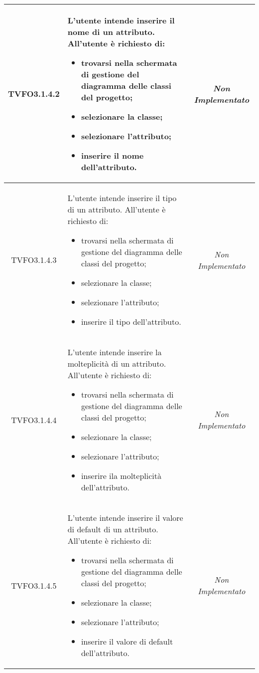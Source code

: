 \begin{longtable}{|c|>{}m{8cm}|c|}
\hypertarget{TVFO3.1.4.2}{TVFO3.1.4.2} & L'utente intende inserire il nome di un attributo.
All'utente è richiesto di:
\begin{itemize}
\item trovarsi nella schermata di gestione del diagramma delle classi del progetto;
\item selezionare la classe;
\item selezionare l'attributo; 
\item inserire il nome dell'attributo.
\end{itemize} & \textit{Non Implementato}\\ \hline
\hypertarget{TVFO3.1.4.3}{TVFO3.1.4.3} & L'utente intende inserire il tipo di un attributo.
All'utente è richiesto di:
\begin{itemize}
\item trovarsi nella schermata di gestione del diagramma delle classi del progetto;
\item selezionare la classe;
\item selezionare l'attributo;
\item inserire il tipo dell'attributo.
\end{itemize} & \textit{Non Implementato}\\ \hline
\hypertarget{TVFO3.1.4.4}{TVFO3.1.4.4} & L'utente intende inserire la molteplicità di un attributo.
All'utente è richiesto di:
\begin{itemize}
\item trovarsi nella schermata di gestione del diagramma delle classi del progetto;
\item selezionare la classe;
\item selezionare l'attributo; 
\item inserire ila molteplicità dell'attributo.
\end{itemize} & \textit{Non Implementato}\\ \hline
\hypertarget{TVFO3.1.4.5}{TVFO3.1.4.5} & L'utente intende inserire il valore di default  di un attributo.
All'utente è richiesto di:
\begin{itemize}
\item trovarsi nella schermata di gestione del diagramma delle classi del progetto;
\item selezionare la classe;
\item selezionare l'attributo;
\item inserire il valore di default  dell'attributo.
\end{itemize} & \textit{Non Implementato}\\ \hline

\end{longtable}
